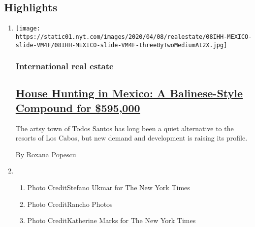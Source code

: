 \hypertarget{highlights}{%
\subsection{Highlights}\label{highlights}}

\begin{enumerate}
\def\labelenumi{\arabic{enumi}.}
\item
  \texttt{[image: https://static01.nyt.com/images/2020/04/08/realestate/08IHH-MEXICO-slide-VM4F/08IHH-MEXICO-slide-VM4F-threeByTwoMediumAt2X.jpg]}

  \hypertarget{international-real-estate}{%
  \subsubsection{International real
  estate}\label{international-real-estate}}

  \hypertarget{house-hunting-in-mexico-a-balinese-style-compound-for-595000}{%
  \subsection{\texorpdfstring{\href{/2020/04/08/realestate/house-hunting-in-mexico-a-balinese-style-compound-for-595000.html}{House
  Hunting in Mexico: A Balinese-Style Compound for
  \$595,000}}{House Hunting in Mexico: A Balinese-Style Compound for \$595,000}}\label{house-hunting-in-mexico-a-balinese-style-compound-for-595000}}

  The artsy town of Todos Santos has long been a quiet alternative to
  the resorts of Los Cabos, but new demand and development is raising
  its profile.

  By Roxana Popescu
\item
  \begin{enumerate}
  \def\labelenumii{\arabic{enumii}.}
  \tightlist
  \item
    Photo CreditStefano Ukmar for The New York Times
  \item
    Photo CreditRancho Photos
  \item
    Photo CreditKatherine Marks for The New York Times
  \end{enumerate}
\end{enumerate}

